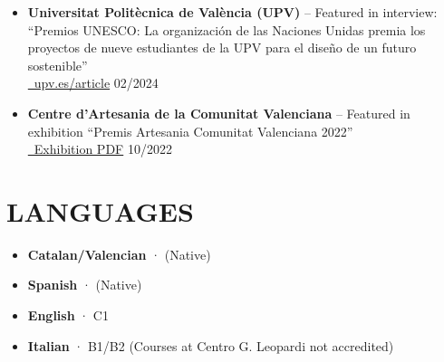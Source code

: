 \documentclass[11pt,a4paper]{article}
\begin{document}
\begin{itemize}[leftmargin=*,label={},itemsep=2pt]
    \item \textbf{Universitat Politècnica de València (UPV)} -- Featured in interview: ``Premios UNESCO: La organización de las Naciones Unidas premia los proyectos de nueve estudiantes de la UPV para el diseño de un futuro sostenible''\\
    \href{https://www.upv.es/noticias-upv/noticia-14469-premios-unesco-es.html}{\faUniversity\ upv.es/article} \hfill 02/2024
    
    \item \textbf{Centre d'Artesania de la Comunitat Valenciana} -- Featured in exhibition ``Premis Artesania Comunitat Valenciana 2022''\\
    \href{https://www.centroartesaniacv.com/galeria/documentos/1672397676_1.PDF}{\faFile\ Exhibition PDF} \hfill 10/2022
\end{itemize}

\section*{LANGUAGES}
\begin{itemize}[leftmargin=*,label={},itemsep=2pt]
    \item \textbf{Catalan/Valencian} · (Native)

    \item \textbf{Spanish} · (Native)
    
    \item \textbf{English} · C1
    
    \item \textbf{Italian} · B1/B2 (Courses at Centro G. Leopardi not accredited)
\end{itemize}

\end{document}
